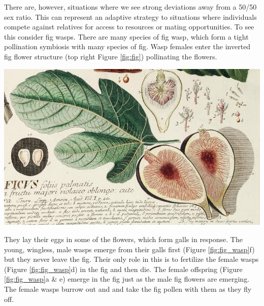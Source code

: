 {There are, however, situations where we see strong deviations away
from a 50/50 sex ratio. This can represent an adaptive strategy to
situations where individuals compete against relatives for access to resources or
mating opportunities. To see this consider fig wasps. There are many
species of fig wasp, which form a tight pollination symbiosis with many species of 
fig. Wasp females enter the inverted fig flower structure (top right
Figure \ref{fig:fig}) pollinating the flowers. \begin{marginfigure}
  \begin{center}
    \includegraphics[width=
    \textwidth]{illustration_images/single_locus_selection/Fig_wasp/cropped_fig.png}  %
\end{center}  %
\caption{ %
Common Fig ({\it Ficus carica}). Despite urban legends the crunch in
figs isn't dead wasps, edible figs are dioecious and female wasps
can't lay in the female flowers that form the fruit we eat. 
} \label{fig:fig}
\end{marginfigure}
 They lay their eggs in some of the
flowers, which form galls in response.  The young, wingless, male
wasps emerge from their galls first (Figure \ref{fig:fig_wasp}f) but
they never leave the fig. Their only role in this is
to fertilize the female wasps (Figure \ref{fig:fig_wasp}d) in the fig and then die. The female
offspring (Figure \ref{fig:fig_wasp}a \& e) emerge in the fig just as the male fig flowers
are emerging. The female wasps burrow out and and take the fig pollen with them as they fly off.

}
